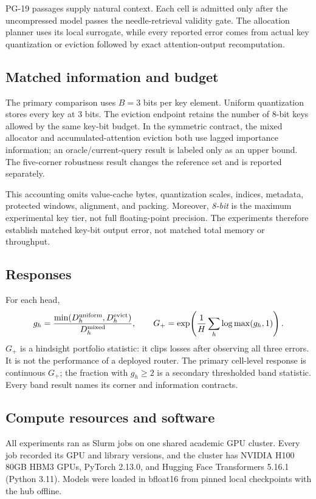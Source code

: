 PG-19 passages supply natural context.  Each cell is admitted only after the
uncompressed model passes the needle-retrieval validity gate.  The allocation
planner uses its local surrogate, while every reported error comes from actual
key quantization or eviction followed by exact attention-output recomputation.

\subsection{Matched information and budget}

The primary comparison uses $B=3$ bits per key element.  Uniform
quantization stores every key at 3 bits.  The eviction endpoint retains the
number of 8-bit keys allowed by the same key-bit budget.  In the symmetric
contract, the mixed allocator and accumulated-attention eviction both use lagged
importance information; an oracle/current-query result is labeled only as an
upper bound.  The five-corner robustness result changes the reference set and is
reported separately.

This accounting omits value-cache bytes, quantization scales, indices, metadata,
protected windows, alignment, and packing.  Moreover, \emph{8-bit} is the maximum
experimental key tier, not full floating-point precision.  The experiments
therefore establish matched key-bit output error, not matched total memory or
throughput.

\subsection{Responses}

For each head,
\[
 g_h=
 \frac{\min(D_h^{\rm uniform},D_h^{\rm evict})}
 {D_h^{\rm mixed}},
 \qquad
 G_+=\exp\!\left(\frac1H\sum_h\log\max(g_h,1)\right).
\]
$G_+$ is a hindsight portfolio statistic: it clips losses after observing all
three errors.  It is not the performance of a deployed router.  The primary
cell-level response is continuous $G_+$; the fraction with $g_h\ge2$ is a
secondary thresholded band statistic.  Every band result names its corner
and information contracts.

\subsection{Compute resources and software}
\label{app:compute}

All experiments ran as Slurm jobs on one shared academic GPU cluster. 
Every job recorded its GPU and library versions, and the cluster has
NVIDIA H100 80GB HBM3 GPUs, PyTorch 2.13.0, and Hugging Face Transformers
5.16.1 (Python 3.11).  Models were loaded in bfloat16 from pinned local
checkpoints with the hub offline. 

